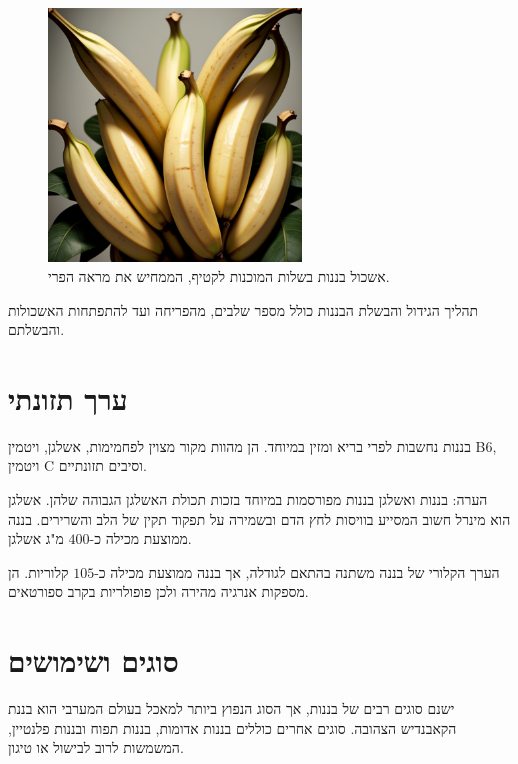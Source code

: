\documentclass[12pt]{article}
\begin{document}
\begin{figure}[H]
  \centering
  \includegraphics[width=0.6\textwidth]{files/ripe_bananas.png}
  \caption{\hebrewfont אשכול בננות בשלות המוכנות לקטיף, הממחיש את מראה הפרי.}
\end{figure}

תהליך הגידול והבשלת הבננות כולל מספר שלבים, מהפריחה ועד להתפתחות האשכולות והבשלתם.

\section{ערך תזונתי}

בננות נחשבות לפרי בריא ומזין במיוחד. הן מהוות מקור מצוין לפחמימות, אשלגן, ויטמין B6, ויטמין C וסיבים תזונתיים.

\begin{remarkBox}{הערה: בננות ואשלגן}
בננות מפורסמות במיוחד בזכות תכולת האשלגן הגבוהה שלהן. אשלגן הוא מינרל חשוב המסייע בוויסות לחץ הדם ובשמירה על תפקוד תקין של הלב והשרירים. בננה ממוצעת מכילה כ-\(400\) מ"ג אשלגן.
\end{remarkBox}

הערך הקלורי של בננה משתנה בהתאם לגודלה, אך בננה ממוצעת מכילה כ-\(105\) קלוריות. הן מספקות אנרגיה מהירה ולכן פופולריות בקרב ספורטאים.

\section{סוגים ושימושים}

ישנם סוגים רבים של בננות, אך הסוג הנפוץ ביותר למאכל בעולם המערבי הוא בננת הקאבנדיש הצהובה. סוגים אחרים כוללים בננות אדומות, בננות תפוח ובננות פלנטיין, המשמשות לרוב לבישול או טיגון.
\end{document}
